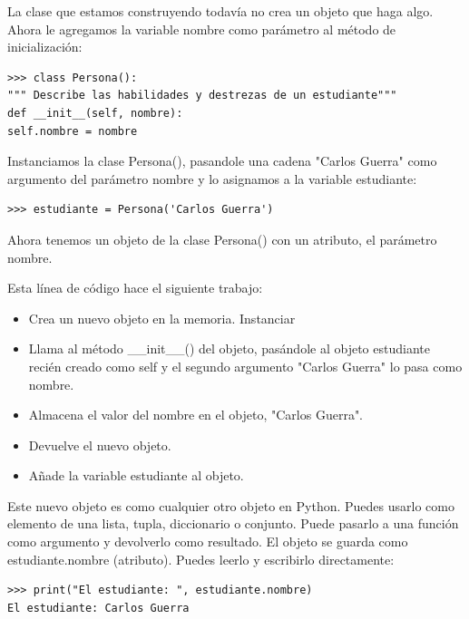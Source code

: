 La clase que estamos construyendo todavía no crea un objeto que haga algo. Ahora le agregamos la variable {\ttfamily nombre} como parámetro al método de inicialización:

\begin{lstlisting}
>>> class Persona():
""" Describe las habilidades y destrezas de un estudiante"""
def __init__(self, nombre):
self.nombre = nombre
\end{lstlisting}

Instanciamos la clase {\ttfamily Persona()}, pasandole una cadena {\ttfamily {}"{}Carlos Guerra{}"{}} como argumento  del parámetro {\ttfamily nombre} y lo asignamos a la variable {\ttfamily estudiante}:


\begin{lstlisting}
>>> estudiante = Persona('Carlos Guerra')
\end{lstlisting}
Ahora tenemos un objeto de la clase {\ttfamily Persona()} con un atributo, el parámetro nombre.

Esta línea de código hace el siguiente trabajo:

\begin{itemize}
\item[] Crea un nuevo objeto en la memoria. Instanciar 
\item[] Llama al método {\ttfamily\_\!\_init\_\!\_()}  del objeto, pasándole al objeto  {\ttfamily estudiante} recién  creado como {\ttfamily self}  y el segundo argumento {}"{}Carlos Guerra{}"{} lo pasa como nombre. 
\item[] Almacena el valor del nombre en el objeto, {}"{}Carlos Guerra{}"{}. 
\item[] Devuelve el nuevo objeto. 
\item[] Añade la variable estudiante al objeto. 	
\end{itemize}

Este nuevo objeto es como cualquier otro objeto en Python. Puedes usarlo como elemento de una lista,
tupla, diccionario o conjunto. Puede pasarlo a una función como argumento y devolverlo como
resultado. El objeto se guarda como {\ttfamily estudiante.nombre}  (atributo). Puedes leerlo y escribirlo directamente:

\begin{lstlisting}
>>> print("El estudiante: ", estudiante.nombre)
El estudiante: Carlos Guerra
\end{lstlisting}

